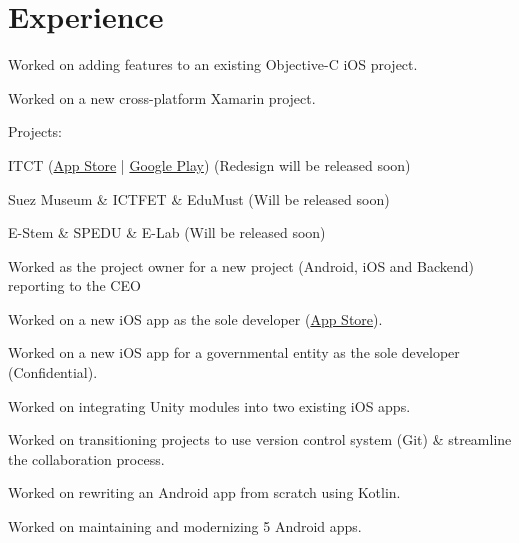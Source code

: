 \documentclass[]{Resume}
\begin{document}
\begin{minipage}[t]{0.63\textwidth} 


\section{Experience}

\vspace{\topsep} %
\begin{tightemize}
\item Worked on adding features to an existing Objective-C iOS project.
\item Worked on a new cross-platform Xamarin project.
\end{tightemize}
\sectionsep

Projects:\\
\begin{tightemize}
\item ITCT (\href{https://apps.apple.com/eg/app/itct/id1457627257}{App Store} | \href{https://play.google.com/store/apps/details?id=com.asugards.itct}{Google Play}) (Redesign will be released soon)
\item Suez Museum \& ICTFET \& EduMust (Will be released soon)
\item E-Stem \& SPEDU \& E-Lab (Will be released soon)
\end{tightemize}
\sectionsep

\begin{tightemize}
\item Worked as the project owner for a new project (Android, iOS and Backend) reporting to the CEO
\item Worked on a new iOS app as the sole developer (\href{http://apps.apple.com/eg/app/ritmo/id1366842426}{App Store}).
\item Worked on a new iOS app for a governmental entity as the sole developer (Confidential).
\item Worked on integrating Unity modules into two existing iOS apps.
\item Worked on transitioning projects to use version control system (Git) \& streamline the collaboration process.
\item Worked on rewriting an Android app from scratch using Kotlin.
\item Worked on maintaining and modernizing 5 Android apps.
\end{tightemize}
\sectionsep


\end{minipage}
\end{document}
